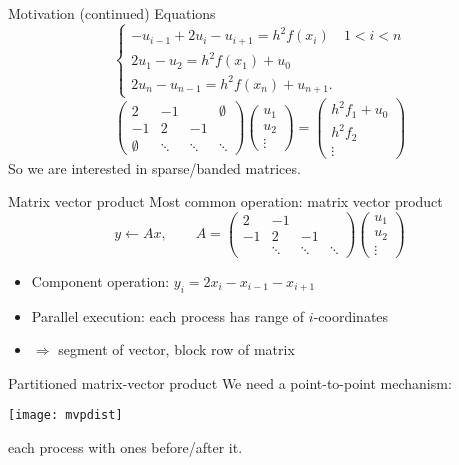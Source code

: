 \begin{numberedframe}{Motivation (continued)}
  Equations
  \[
  \begin{cases}
    -u_{i-1} + 2u_i - u_{i+1} = h^2f(x_i)&1<i<n \\
    2u_1-u_2=h^2f(x_1)+u_0\\
    2u_n-u_{n-1}=h^2f(x_{n})+u_{n+1}.
  \end{cases}
  \]
  \begin{equation}
    \begin{pmatrix}
      2&-1&&\emptyset\\ -1&2&-1\\ \emptyset&\ddots&\ddots&\ddots
    \end{pmatrix}
    \begin{pmatrix}
      u_1\\ u_2\\ \vdots
    \end{pmatrix}
    =
    \begin{pmatrix}
      h^2f_1+u_0\\ h^2f_2\\ \vdots
    \end{pmatrix}
    \label{eq:1d2nd-matrix-vector}
  \end{equation}
  So we are interested in sparse/banded matrices.
\end{numberedframe}

\begin{numberedframe}{Matrix vector product}
  Most common operation: matrix vector product
  \[ y\leftarrow Ax,\qquad
  A = \begin{pmatrix}
      2&-1\\ -1&2&-1\\ &\ddots&\ddots&\ddots
    \end{pmatrix}
    \begin{pmatrix}
      u_1\\ u_2\\ \vdots
    \end{pmatrix}
  \]
  \begin{itemize}
  \item Component operation: $y_i=2x_i-x_{i-1}-x_{i+1}$
  \item Parallel execution: each process has range of $i$-coordinates
  \item $\Rightarrow$ segment of vector, block row of matrix
  \end{itemize}  
\end{numberedframe}

\begin{numberedframe}{Partitioned matrix-vector product}
  We need a point-to-point mechanism:
  
  \texttt{[image: mvpdist]}

  each process with ones before/after it.
\end{numberedframe}

